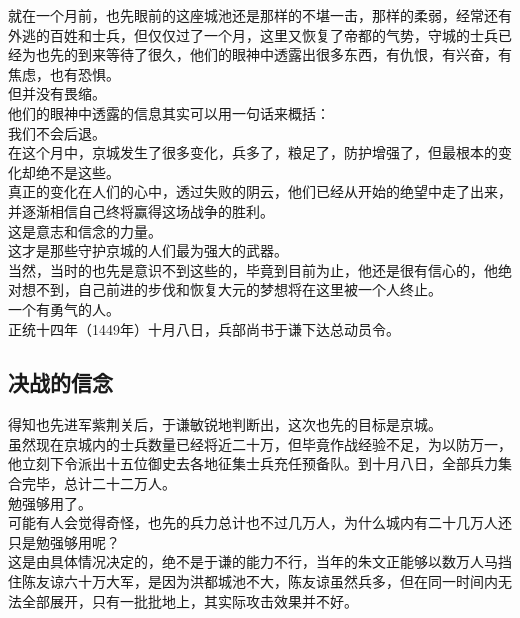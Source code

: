 \begin{multicols}{\theparacolNo}
就在一个月前，也先眼前的这座城池还是那样的不堪一击，那样的柔弱，经常还有外逃的百姓和士兵，但仅仅过了一个月，这里又恢复了帝都的气势，守城的士兵已经为也先的到来等待了很久，他们的眼神中透露出很多东西，有仇恨，有兴奋，有焦虑，也有恐惧。\\

但并没有畏缩。\\

他们的眼神中透露的信息其实可以用一句话来概括：\\

我们不会后退。\\

在这个月中，京城发生了很多变化，兵多了，粮足了，防护增强了，但最根本的变化却绝不是这些。\\

真正的变化在人们的心中，透过失败的阴云，他们已经从开始的绝望中走了出来，并逐渐相信自己终将赢得这场战争的胜利。\\

这是意志和信念的力量。\\

这才是那些守护京城的人们最为强大的武器。\\

当然，当时的也先是意识不到这些的，毕竟到目前为止，他还是很有信心的，他绝对想不到，自己前进的步伐和恢复大元的梦想将在这里被一个人终止。\\

一个有勇气的人。\\

正统十四年（1449年）十月八日，兵部尚书于谦下达总动员令。\\

\subsection{决战的信念}
得知也先进军紫荆关后，于谦敏锐地判断出，这次也先的目标是京城。\\

虽然现在京城内的士兵数量已经将近二十万，但毕竟作战经验不足，为以防万一，他立刻下令派出十五位御史去各地征集士兵充任预备队。到十月八日，全部兵力集合完毕，总计二十二万人。\\

勉强够用了。\\

可能有人会觉得奇怪，也先的兵力总计也不过几万人，为什么城内有二十几万人还只是勉强够用呢？\\

这是由具体情况决定的，绝不是于谦的能力不行，当年的朱文正能够以数万人马挡住陈友谅六十万大军，是因为洪都城池不大，陈友谅虽然兵多，但在同一时间内无法全部展开，只有一批批地上，其实际攻击效果并不好。\\


\end{multicols}
